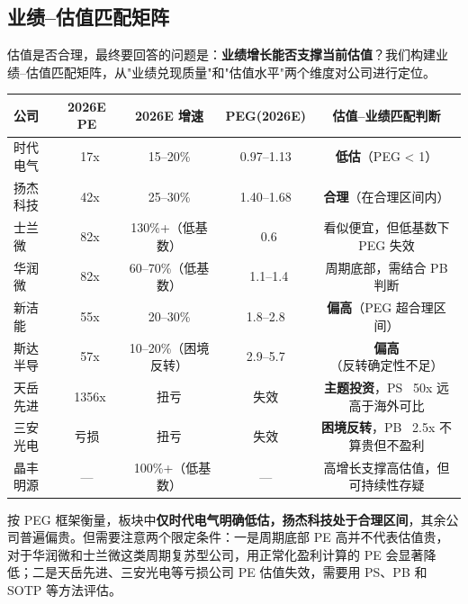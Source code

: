 \subsection{业绩--估值匹配矩阵}

估值是否合理，最终要回答的问题是：\textbf{业绩增长能否支撑当前估值}？我们构建业绩--估值匹配矩阵，从"业绩兑现质量"和"估值水平"两个维度对公司进行定位。

\begin{exhibitbox}[表 7-11：业绩--估值匹配矩阵]
\centering
\small
\begin{tabularx}{\textwidth}{l c c c c}
\toprule
\textbf{公司} & \textbf{2026E PE} & \textbf{2026E 增速} & \textbf{PEG(2026E)} & \textbf{估值--业绩匹配判断} \\
\midrule
\rowcolor{riskgreen!10}
时代电气 & ~17x & 15–20\% & 0.97–1.13 & \textbf{低估}（PEG < 1） \\
\rowcolor{riskgreen!10}
扬杰科技 & ~42x & 25–30\% & 1.40–1.68 & \textbf{合理}（在合理区间内） \\
\rowcolor{riskamber!10}
士兰微 & ~82x & 130\%+（低基数） & ~0.6 & 看似便宜，但低基数下 PEG 失效 \\
\rowcolor{riskamber!10}
华润微 & ~82x & 60–70\%（低基数） & ~1.1–1.4 & 周期底部，需结合 PB 判断 \\
\rowcolor{riskred!10}
新洁能 & ~55x & 20–30\% & 1.8–2.8 & \textbf{偏高}（PEG 超合理区间） \\
\rowcolor{riskred!10}
斯达半导 & ~57x & 10–20\%（困境反转） & 2.9–5.7 & \textbf{偏高}（反转确定性不足） \\
\rowcolor{riskred!10}
天岳先进 & ~1356x & 扭亏 & 失效 & \textbf{主题投资}，PS ~50x 远高于海外可比 \\
\rowcolor{riskred!10}
三安光电 & 亏损 & 扭亏 & 失效 & \textbf{困境反转}，PB ~2.5x 不算贵但不盈利 \\
\rowcolor{riskamber!10}
晶丰明源 & — & ~100\%+（低基数） & — & 高增长支撑高估值，但可持续性存疑 \\
\bottomrule
\end{tabularx}
\end{exhibitbox}

按 PEG 框架衡量，板块中\textbf{仅时代电气明确低估，扬杰科技处于合理区间}，其余公司普遍偏贵。但需要注意两个限定条件：一是周期底部 PE 高并不代表估值贵，对于华润微和士兰微这类周期复苏型公司，用正常化盈利计算的 PE 会显著降低；二是天岳先进、三安光电等亏损公司 PE 估值失效，需要用 PS、PB 和 SOTP 等方法评估。

